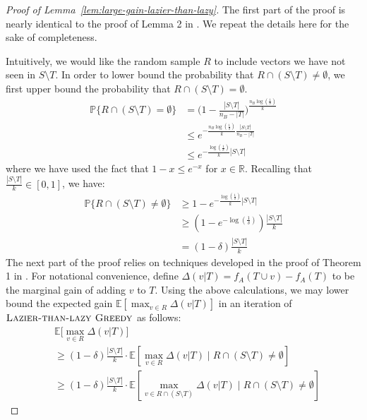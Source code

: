 \documentclass{article}
\newcommand{\E}{\mathbb{E}}
\newcommand{\ltlgreedy}{\textsc{Lazier-than-lazy Greedy}}
\begin{document}
\begin{proof}[Proof of Lemma~\ref{lem:large-gain-lazier-than-lazy}]
The first part of the proof is nearly identical to the proof of Lemma 2 in \cite{Mirzasoleiman}. We repeat the details here for the sake of completeness.

Intuitively, we would like the random sample $R$ to include vectors we have not seen in $S \setminus T$. In order to lower bound the probability that $R \cap (S \setminus T) \neq \emptyset$, we first upper bound the probability that $R \cap (S \setminus T) = \emptyset$.
\begin{align}
\mathbb{P}\{R \cap (S \setminus T) = \emptyset\}
&= \Big(1 - \frac{|S \setminus T|}{n_B - |T|}\Big)^{\frac{n_B \log(\frac{1}{\delta})}{k}} \label{Stochastic greedy lemma eq 1}
\\ &\leq e^{-\frac{n_B \log(\frac{1}{\delta})}{k} \frac{|S \setminus T|}{n_B - |T|}} 
\\ &\leq e^{-\frac{\log(\frac{1}{\delta})}{k} |S \setminus T|} 
\end{align}
where we have used the fact that $1 - x \leq e^{-x}$ for $x \in \mathbb{R}$. Recalling that $\frac{|S\setminus T|}{k} \in [0, 1]$, we have:
\begin{align}
\mathbb{P}\{R \cap (S \setminus T) \neq \emptyset\}
&\geq 1 - e^{-\frac{\log(\frac{1}{\delta})}{k} |S \setminus T|}
\\ &\geq (1 - e^{-\log(\frac{1}{\delta})}) \frac{|S \setminus T|}{k}
\\ &= (1 - \delta) \frac{|S \setminus T|}{k} \label{Stochastic greedy lemma eq 2}
\end{align}
The next part of the proof relies on techniques developed in the proof of Theorem 1 in \cite{Mirzasoleiman}. For notational convenience, define $\Delta(v|T) = f_A(T \cup v) - f_A(T)$ to be the marginal gain of adding $v$ to $T$. Using the above calculations, we may lower bound the expected gain $\mathbb{E}[\max_{v \in R} \Delta(v | T)]$ in an iteration of $\ltlgreedy$ as follows:
\begin{align}
& \mathbb{E} \big[\max_{v \in R} \Delta(v | T)\big]
\\ &\geq (1 - \delta) \frac{|S \setminus T|}{k} \cdot \E[\max_{v \in R} \Delta(v | T) \; \Big| \; R \cap (S \setminus T) \neq \emptyset] \label{Stochastic greedy lemma eq 3}
\\ &\geq (1 - \delta) \frac{|S \setminus T|}{k} \cdot \E[\max_{v \in R \cap (S \setminus T)} \Delta(v | T) \; \Big| \; R \cap (S \setminus T) \neq \emptyset] \label{Stochastic greedy lemma eq 4}

\end{align}
\end{proof}
\end{document}
